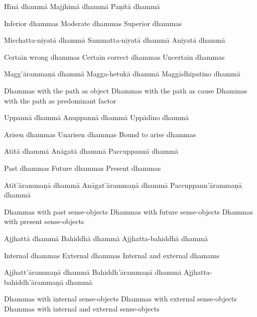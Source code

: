 Hīnā dhammā
Majjhimā dhammā
Paṇītā dhammā

\begin{english}
  Inferior dhammas
  Moderate dhammas
  Superior dhammas
\end{english}

Micchatta-niyatā dhammā
Sammatta-niyatā dhammā
Aniyatā dhammā

\begin{english}
  Certain wrong dhammas
  Certain correct dhammas
  Uncertain dhammas
\end{english}

Magg’ārammaṇā dhammā
Magga-hetukā dhammā
Maggādhipatino dhammā

\begin{english}
  Dhammas with the path as object
  Dhammas with the path as cause
  Dhammas with the path as predominant factor
\end{english}

Uppannā dhammā
Anuppannā dhammā
Uppādino dhammā

\begin{english}
  Arisen dhammas
  Unarisen dhammas
  Bound to arise dhammas
\end{english}

Atītā dhammā
Anāgatā dhammā
Paccuppannā dhammā

\begin{english}
  Past dhammas
  Future dhammas
  Present dhammas
\end{english}

Atīt’ārammaṇā dhammā
Anāgat’ārammaṇā dhammā
Paccuppann’ārammaṇā dhammā

\begin{english}
  Dhammas with past sense-objects
  Dhammas with future sense-objects
  Dhammas with present sense-objects
\end{english}

Ajjhattā dhammā
Bahiddhā dhammā
Ajjhatta-bahiddhā dhammā

\begin{english}
  Internal dhammas
  External dhammas
  Internal and external dhamams
\end{english}

Ajjhatt’ārammaṇā dhammā
Bahiddh’ārammaṇā dhammā
Ajjhatta-bahiddh’ārammaṇā dhammā

\begin{english}
  Dhammas with internal sense-objects
  Dhammas with external sense-objects
  Dhammas with internal and external sense-objects
\end{english}

